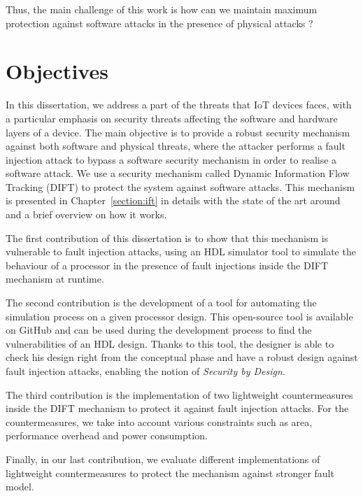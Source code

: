 Thus, the main challenge of this work is how can we maintain maximum protection against software attacks in the presence of physical attacks ?

\section{Objectives}

In this dissertation, we address a part of the threats that IoT devices faces, with a particular emphasis on security threats affecting the software and hardware layers of a device. The main objective is to provide a robust security mechanism against both software and physical threats, where the attacker performs a fault injection attack to bypass a software security mechanism in order to realise a software attack.
We use a security mechanism called Dynamic Information Flow Tracking (DIFT) to protect the system against software attacks. This mechanism is presented in Chapter~\ref{section:ift} in details with the state of the art around and a brief overview on how it works.

The first contribution of this dissertation is to show that this mechanism is vulnerable to fault injection attacks, using an HDL simulator tool to simulate the behaviour of a processor in the presence of fault injections inside the DIFT mechanism at runtime.

The second contribution is the development of a tool for automating the simulation process on a given processor design. This open-source tool is available on GitHub and can be used during the development process to find the vulnerabilities of an HDL design. Thanks to this tool, the designer is able to check his design right from the conceptual phase and have a robust design against fault injection attacks, enabling the notion of \textit{Security by Design}.

The third contribution is the implementation of two lightweight countermeasures inside the DIFT mechanism to protect it against fault injection attacks. For the countermeasures, we take into account various constraints such as area, performance overhead and power consumption.

Finally, in our last contribution, we evaluate different implementations of lightweight countermeasures to protect the mechanism against stronger fault model.


